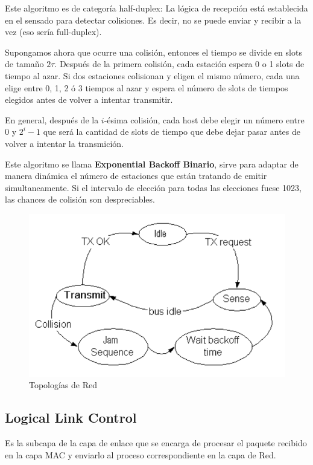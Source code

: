 Este algoritmo es de categoría half-duplex: La lógica de recepción está establecida en el sensado para detectar colisiones. Es decir, no se puede enviar y recibir a la vez (eso sería full-duplex).

Supongamos ahora que ocurre una colisión, entonces el tiempo se divide en slots de tamaño \(2\tau\). Después de la primera colisión, cada estación espera 0 o 1 slots de tiempo al azar. Si dos estaciones colisionan y eligen el mismo número, cada una elige entre 0, 1, 2 ó 3 tiempos al azar y espera el número de slots de tiempos elegidos antes de volver a intentar transmitir.

En general, después de la \(i\)-ésima colisión, cada host debe elegir un número entre 0 y \(2^i-1\) que será la cantidad de slots de tiempo que debe dejar pasar antes de volver a intentar la transmición.

Este algoritmo se llama \textbf{Exponential Backoff Binario}, sirve para adaptar de manera dinámica el número de estaciones que están tratando de emitir simultaneamente. Si el intervalo de elección para todas las elecciones fuese 1023, las chances de colisión son despreciables.


\begin{figure}[H]
	\centering
	\includegraphics[width=\textwidth
]{images/csma-cd.png}
	\caption[Topologías de Red]{Topologías de Red}
	\label{fig:csma-cd}
\end{figure}

\subsection{Logical Link Control}
Es la subcapa de la capa de enlace que se encarga de procesar el paquete recibido en la capa MAC y enviarlo al proceso correspondiente en la capa de Red.

